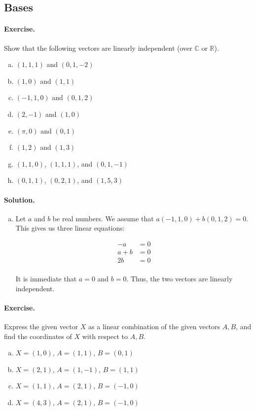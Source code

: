 \documentclass[12pt, titlepage]{article}
\newenvironment{exercise}{\paragraph{Exercise.}}{}
\newenvironment{solution}{\paragraph{Solution.}}{}
\newcommand{\C}{\mathbb{C}}
\newcommand{\R}{\mathbb{R}}
\begin{document}
\subsection{Bases}

\begin{exercise}
  Show that the following vectors are linearly independent (over $\C$ or $\R$).

  \begin{multicols}{2}
    \begin{enumerate}[(a), noitemsep]
      \item $(1, 1, 1)$ and $(0, 1, -2)$
      \item $(1, 0)$ and $(1, 1)$
      \item $(-1, 1, 0)$ and $(0, 1, 2)$
      \item $(2, -1)$ and $(1, 0)$
      \item $(\pi, 0)$ and $(0, 1)$
      \item $(1, 2)$ and $(1, 3)$
      \item $(1, 1, 0)$, $(1, 1, 1)$, and $(0, 1, -1)$
      \item $(0, 1, 1)$, $(0, 2, 1)$, and $(1, 5, 3)$
    \end{enumerate}
  \end{multicols}
\end{exercise}

\begin{solution}
  \begin{enumerate}[(a)]
    \item Let $a$ and $b$ be real numbers. We assume that $a(-1, 1, 0) + b(0,
      1, 2) = 0$. This gives us three linear equations:

      \[
        \begin{aligned}
          -a    & = 0 \\
          a + b & = 0 \\
          2b    & = 0 \\
        \end{aligned}
      \]

      It is immediate that $a = 0$ and $b = 0$. Thus, the two vectors are
      linearly independent.
  \end{enumerate}
\end{solution}

\begin{exercise}
  Express the given vector $X$ as a linear combination of the given vectors $A,
  B$, and find the coordinates of $X$ with respect to $A, B$.

  \begin{enumerate}[(a), noitemsep]
    \item $X = (1, 0)$, $A = (1, 1)$, $B = (0, 1)$
    \item $X = (2, 1)$, $A = (1, -1)$, $B = (1, 1)$
    \item $X = (1, 1)$, $A = (2, 1)$, $B = (-1, 0)$
    \item $X = (4, 3)$, $A = (2, 1)$, $B = (-1, 0)$
  \end{enumerate}
\end{exercise}
\end{document}
